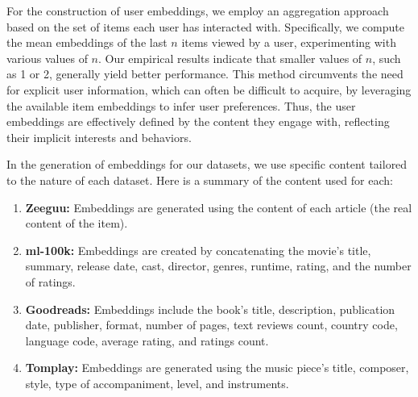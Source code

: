 For the construction of user embeddings, we employ an aggregation approach based on the set of items each user has interacted with. Specifically, we compute the mean embeddings of the last $n$ items viewed by a user, experimenting with various values of $n$. Our empirical results indicate that smaller values of $n$, such as 1 or 2, generally yield better performance. This method circumvents the need for explicit user information, which can often be difficult to acquire, by leveraging the available item embeddings to infer user preferences. Thus, the user embeddings are effectively defined by the content they engage with, reflecting their implicit interests and behaviors.


In the generation of embeddings for our datasets, we use specific content tailored to the nature of each dataset. Here is a summary of the content used for each:

\begin{enumerate}
    \item \textbf{Zeeguu:} Embeddings are generated using the content of each article (the real content of the item).

    \item \textbf{ml-100k:} Embeddings are created by concatenating the movie's title, summary, release date, cast, director, genres, runtime, rating, and the number of ratings.

    \item \textbf{Goodreads:} Embeddings include the book's title, description, publication date, publisher, format, number of pages, text reviews count, country code, language code, average rating, and ratings count.

    \item \textbf{Tomplay:} Embeddings are generated using the music piece's title, composer, style, type of accompaniment, level, and instruments.
\end{enumerate}


